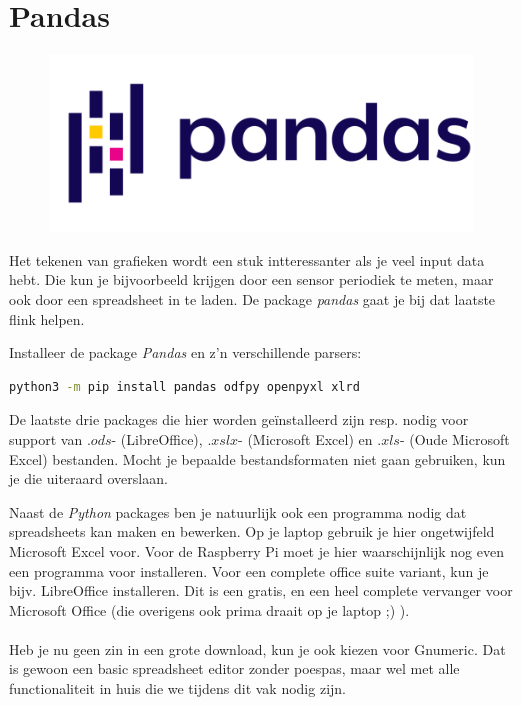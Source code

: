 \section{Pandas}
\begin{figure}[h!]
\centering\includegraphics[scale=0.2]{Pictures/chapter07/pandas_logo.png}
\label{fig:pandaslogo} %
\end{figure}

Het tekenen van grafieken wordt een stuk intteressanter als je veel input data hebt. Die kun je bijvoorbeeld krijgen door een sensor periodiek te meten, maar ook door een spreadsheet in te laden. De package \textit{pandas} gaat je bij dat laatste flink helpen.

\begin{exercise}
Installeer de package \textit{Pandas} en z'n verschillende parsers:
\begin{lstlisting}[language=bash]
python3 -m pip install pandas odfpy openpyxl xlrd
\end{lstlisting}
De laatste drie packages die hier worden geïnstalleerd zijn resp. nodig voor support van $.ods$- (LibreOffice), $.xslx$- (Microsoft Excel) en $.xls$- (Oude Microsoft Excel) bestanden. Mocht je bepaalde bestandsformaten niet gaan gebruiken, kun je die uiteraard overslaan.
\end{exercise}

Naast de \textit{Python} packages ben je natuurlijk ook een programma nodig dat spreadsheets kan maken en bewerken. Op je laptop gebruik je hier ongetwijfeld Microsoft Excel voor. Voor de Raspberry Pi moet je hier waarschijnlijk nog even een programma voor installeren. Voor een complete office suite variant, kun je bijv. LibreOffice installeren. Dit is een gratis, en een heel complete vervanger voor Microsoft Office (die overigens ook prima draait op je laptop ;) ).\\\\ 
Heb je nu geen zin in een grote download, kun je ook kiezen voor Gnumeric. Dat is gewoon een basic spreadsheet editor zonder poespas, maar wel met alle functionaliteit in huis die we tijdens dit vak nodig zijn.

